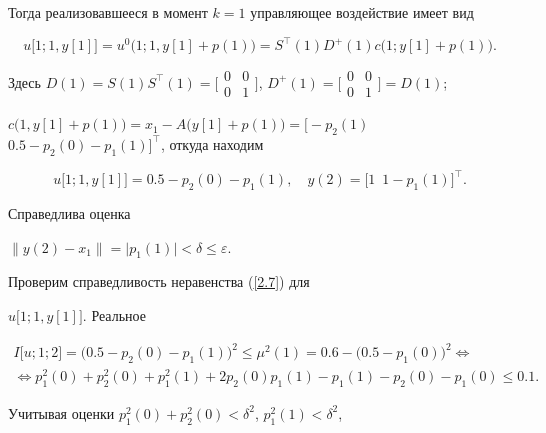 Тогда реализовавшееся в момент $k=1$ управляющее воздействие имеет вид


$$


u\bigl[1; 1, y[1]\bigr]=u^0\bigl(1; 1, y[1]+p(1)\bigr)=S^{\top}(1) D^+(1) 


c\bigl(1; y[1]+p(1)\bigr).


$$


Здесь $D(1)=S(1) S^{\top}(1)=\bigl[


\begin{smallmatrix} 0&0\\0&1


\end{smallmatrix}\bigr]$, $D^+(1)=\bigl[ \begin{smallmatrix} 0&0\\0&1


\end{smallmatrix}\bigr]=D(1)$;


$c\bigl(1, y[1]+p(1)\bigr)=x_1- A\bigl(y[1]+p(1)\bigr)=


\bigl[-p_2(1)$\; $0.5-p_2(0)-p_1(1)\bigr]^{\top}$, откуда находим


$$


u\bigl[1; 1, y[1]\bigr]=


0.5-p_2(0)-p_1(1),\quad y(2)=\bigl[1\ \; 1-p_1(1)\bigr]^{\top}.


$$


Справедлива оценка


$\bigl\|y(2)-x_1\bigr\|=\bigl|p_1(1)\bigr|<\delta\le\varepsilon$.





Проверим справедливость неравенства (\ref{2.7}) для


$u\bigl[1; 1, y[1]\bigr]$. Реальное


\begin{multline*}


I\bigl[u; 1; 2\bigr]=\bigl(0.5-p_2(0)-p_1(1)\bigr)^2\le


\mu^2(1)=0.6-\bigl(0.5-p_1(0)\bigr)^2\Leftrightarrow \\


%


\Leftrightarrow


p_1^2(0)+p^2_2(0)+p_1^2(1)+2p_2(0) p_1(1)-p_1(1)-p_2(0)-p_1(0)\le 0.1.


\end{multline*}


Учитывая оценки $p_1^2(0)+p^2_2(0)<\delta^2$, $p_1^2(1)<\delta^2$,


